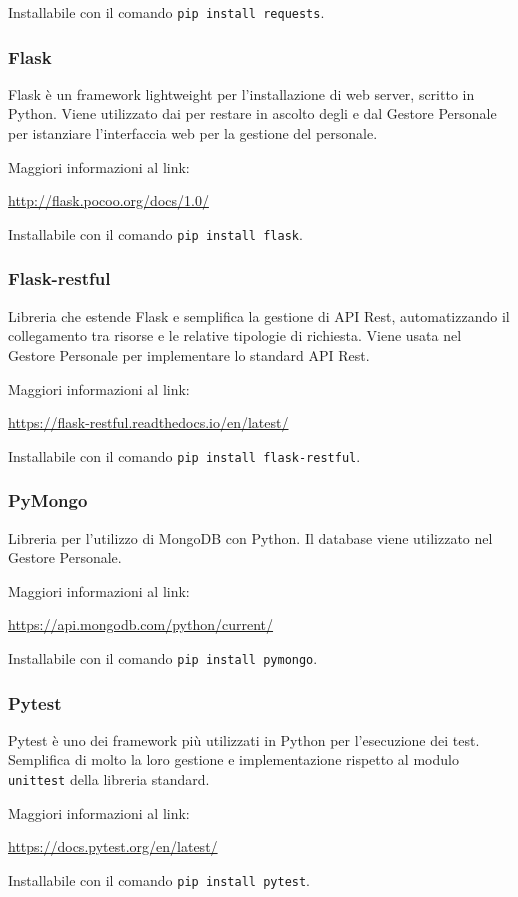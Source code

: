 Installabile con il comando \texttt{pip install requests}.

\subsubsection{Flask}
Flask è un framework lightweight per l'installazione di web server, scritto in Python.
Viene utilizzato dai  per restare in ascolto degli  e dal Gestore Personale per istanziare l'interfaccia
web per la gestione del personale.

Maggiori informazioni al link:

\begin{center}
    \url{http://flask.pocoo.org/docs/1.0/}
\end{center}

Installabile con il comando \texttt{pip install flask}.

\subsubsection{Flask-restful}
Libreria che estende Flask e semplifica la gestione di API Rest, automatizzando il collegamento tra risorse e le relative tipologie di richiesta.
Viene usata nel Gestore Personale per implementare lo standard API Rest.

Maggiori informazioni al link:

\begin{center}
    \url{https://flask-restful.readthedocs.io/en/latest/}
\end{center}

Installabile con il comando \texttt{pip install flask-restful}.

\subsubsection{PyMongo}

Libreria per l'utilizzo di MongoDB con Python. Il database viene utilizzato nel Gestore Personale.

Maggiori informazioni al link:

\begin{center}
    \url{https://api.mongodb.com/python/current/}
\end{center}

Installabile con il comando \texttt{pip install pymongo}.

\subsubsection{Pytest}
Pytest è uno dei framework più utilizzati in Python per l'esecuzione dei test. Semplifica di molto la loro gestione e implementazione rispetto al modulo \texttt{unittest}
della libreria standard.

Maggiori informazioni al link:

\begin{center}
    \url{https://docs.pytest.org/en/latest/}
\end{center}

Installabile con il comando \texttt{pip install pytest}.
